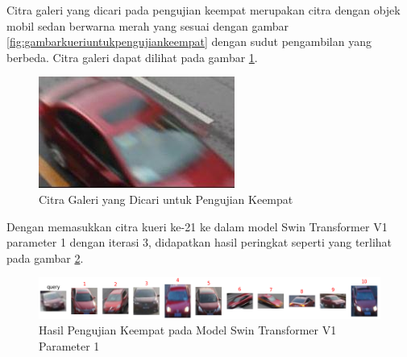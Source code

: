Citra galeri yang dicari pada pengujian keempat merupakan citra dengan objek \linebreak mobil sedan berwarna merah 
yang sesuai dengan gambar \ref{fig:gambarkueriuntukpengujiankeempat} dengan sudut pengambilan yang berbeda. 
Citra galeri dapat dilihat pada gambar \ref{fig:gambargaleriuntukpengujiankeempat}.\\

\begin{figure}[h!]
  \centering
  \includegraphics[scale=0.6]{gambar/Gal21_1046.jpg}
  \caption{Citra Galeri yang Dicari untuk Pengujian Keempat}
  \label{fig:gambargaleriuntukpengujiankeempat}
\end{figure}

Dengan memasukkan citra kueri ke-21 ke dalam model Swin Transformer V1 parameter 1 dengan iterasi 3, didapatkan hasil 
peringkat seperti yang terlihat pada gambar \ref{fig:hasilpengujiankeempatpadamodelswintransformerv1param1}.

\begin{figure}[h!]
  \centering
  \includegraphics[scale=0.6]{gambar/Que21V1P1IT3.png}
  \caption{Hasil Pengujian Keempat pada Model Swin Transformer V1 Parameter 1}
  \label{fig:hasilpengujiankeempatpadamodelswintransformerv1param1}
\end{figure}

